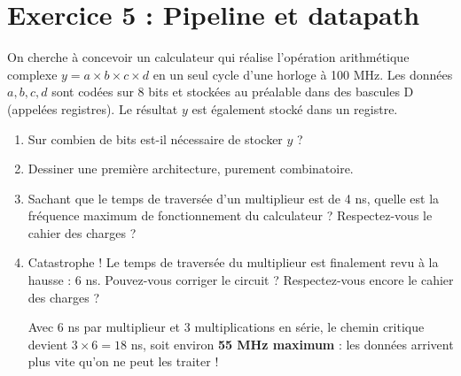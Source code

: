 \documentclass[a4paper,11pt]{article}
\newif\ifsolutions
\begin{document}
\newpage

\section{Exercice 5 : Pipeline et datapath}

On cherche à concevoir un calculateur qui réalise l'opération arithmétique complexe $y = a \times b \times c \times d$ en un seul cycle d'une horloge à 100 MHz. Les données $a, b, c, d$ sont codées sur 8 bits et stockées au préalable dans des bascules D (appelées registres). Le résultat $y$ est également stocké dans un registre.

\begin{enumerate}
    \item Sur combien de bits est-il nécessaire de stocker $y$ ?

    \ifsolutions
    \begin{solbox}
    La multiplication s'écrit :
    $$ M = \prod_{i=0}^{n-1} x_i, \quad x_i \in \{0, \dots, 2^m - 1\} $$
    D'où :
    $$ D(M_{max}) = \lfloor \log_2(2^m - 1)^n + 1 \rfloor = n \cdot \lfloor \log_2(2^m - 1) \rfloor + 1 $$
    \end{solbox}
    \fi

    \item Dessiner une première architecture, purement combinatoire.

    \item Sachant que le temps de traversée d'un multiplieur est de 4 ns, quelle est la fréquence maximum de fonctionnement du calculateur ? Respectez-vous le cahier des charges ?

    \ifsolutions
    \begin{solbox}
    $4 \times 4 = 16$ ns $\implies$ fréquence max = $\frac{1}{16 \times 10^{-9}} \approx 62{,}5$ MHz.\\
    \textit{Note :} si l'on considère un multiplieur isolé à 4 ns, on retombe à 125 MHz comme précédemment. Le chemin critique dépend de l'architecture choisie (parallèle ou chaînée).
    \end{solbox}
    \fi

    \item Catastrophe ! Le temps de traversée du multiplieur est finalement revu à la hausse : 6 ns. Pouvez-vous corriger le circuit ? Respectez-vous encore le cahier des charges ?

    \ifsolutions
    \begin{solbox}
    Avec 6 ns par multiplieur et 3 multiplications en série, le chemin critique devient $3 \times 6 = 18$ ns, soit environ \textbf{55 MHz maximum} : les données arrivent plus vite qu'on ne peut les traiter !


\end{solbox}
\end{enumerate}
\end{document}
